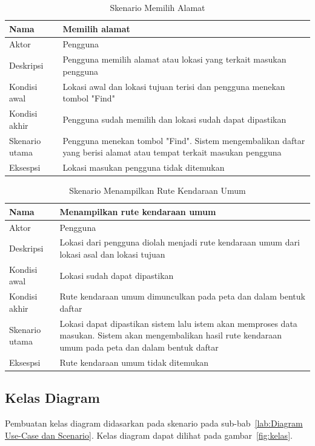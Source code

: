 \begin{table}[H]
	\centering
		\begin{tabular}{ |p{2cm}|p{10cm}| }
			\hline
			Nama &  Memilih alamat\\ \hline
			Aktor & Pengguna  \\ \hline
			Deskripsi & Pengguna memilih alamat atau lokasi yang terkait masukan pengguna \\ \hline
			Kondisi awal & Lokasi awal dan lokasi tujuan terisi dan pengguna menekan tombol "Find" \\ \hline
			Kondisi akhir & Pengguna sudah memilih dan lokasi sudah dapat dipastikan  \\ \hline
			Skenario utama & Pengguna menekan tombol "Find". Sistem mengembalikan daftar yang berisi alamat atau tempat terkait masukan pengguna \\ \hline
			Eksespsi & Lokasi masukan pengguna tidak ditemukan  \\ 
			\hline
		\end{tabular}
	\caption{Skenario Memilih Alamat}
	\label{tab:memilihAlamat}
\end{table}

\begin{table}[H]
	\centering
		\begin{tabular}{ |p{2cm}|p{10cm}| }
			\hline
			Nama &  Menampilkan rute kendaraan umum\\ \hline
			Aktor & Pengguna  \\ \hline
			Deskripsi & Lokasi dari pengguna diolah menjadi rute kendaraan umum dari lokasi asal dan lokasi tujuan \\ \hline
			Kondisi awal & Lokasi sudah dapat dipastikan \\ \hline
			Kondisi akhir & Rute kendaraan umum dimunculkan pada peta dan dalam bentuk daftar \\ \hline
			Skenario utama & Lokasi dapat dipastikan sistem lalu istem akan memproses data masukan. Sistem akan mengembalikan hasil rute kendaraan umum pada peta dan dalam bentuk daftar \\ \hline
			Eksespsi & Rute kendaraan umum tidak ditemukan  \\ 
			\hline
		\end{tabular}
	\caption{Skenario Menampilkan Rute Kendaraan Umum}
	\label{tab:menampilkan}
\end{table}

\subsection{Kelas Diagram}
\label{lab:Kelas Diagram}
\hspace{0.5cm} Pembuatan kelas diagram didasarkan pada skenario pada sub-bab~\ref{lab:Diagram Use-Case dan Scenario}. Kelas diagram dapat dilihat pada gambar~\ref{fig:kelas}.

